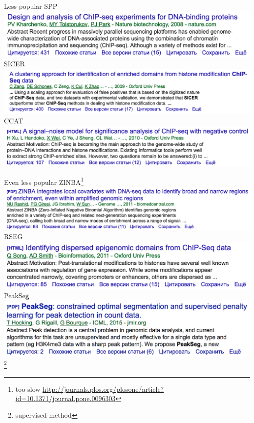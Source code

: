 \documentclass{beamer}
\begin{document}
\begin{frame}{Less popular}
SPP\\
\includegraphics[width=\linewidth]{SPP.png}\\
SICER\\
\includegraphics[width=\linewidth]{SICER.png}\\
CCAT\\
\includegraphics[width=\linewidth]{CCAT.png}\\
\end{frame}

\begin{frame}{Even less popular}
ZINBA\footnote{too slow \url{http://journals.plos.org/plosone/article?id=10.1371/journal.pone.0096303}}\\
\includegraphics[width=0.85\linewidth]{ZINBA.png}\\
RSEG\\
\includegraphics[width=0.85\linewidth]{RSEG.png}\\
PeakSe\textbf{g}\\
\includegraphics[width=0.85\linewidth]{peakseg.png}\footnote{supervised method}
\end{frame}
\end{document}
